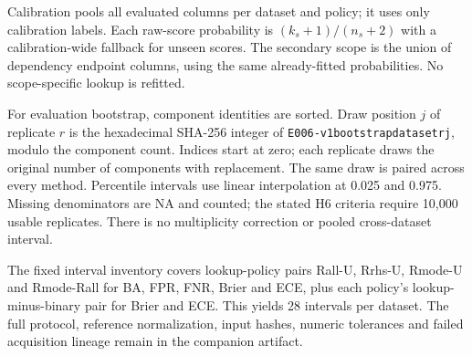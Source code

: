 Calibration pools all evaluated columns per dataset and policy; it uses
only calibration labels. Each raw-score probability is
\((k_s+1)/(n_s+2)\) with a calibration-wide fallback for unseen scores.
The secondary scope is the union of dependency endpoint columns, using
the same already-fitted probabilities. No scope-specific lookup is
refitted.

For evaluation bootstrap, component identities are sorted. Draw position
\(j\) of replicate \(r\) is the hexadecimal SHA-256 integer of
\texttt{E006-v1\textbar{}bootstrap\textbar{}dataset\textbar{}r\textbar{}j},
modulo the component count. Indices start at zero; each replicate draws
the original number of components with replacement. The same draw is
paired across every method. Percentile intervals use linear
interpolation at 0.025 and 0.975. Missing denominators are NA and
counted; the stated H6 criteria require 10,000 usable replicates. There
is no multiplicity correction or pooled cross-dataset interval.

The fixed interval inventory covers lookup-policy pairs Rall-U, Rrhs-U,
Rmode-U and Rmode-Rall for BA, FPR, FNR, Brier and ECE, plus each
policy's lookup-minus-binary pair for Brier and ECE. This yields 28
intervals per dataset. The full protocol, reference normalization, input
hashes, numeric tolerances and failed acquisition lineage remain in the
companion artifact.
